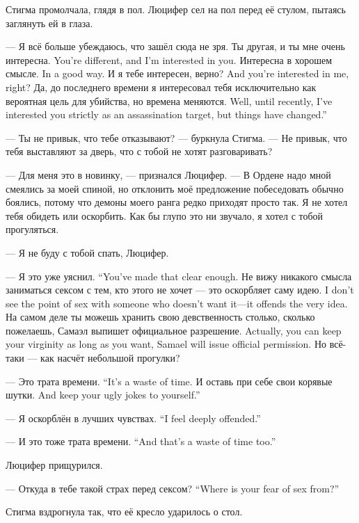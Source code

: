 Стигма промолчала, глядя в пол.
Люцифер сел на пол перед её стулом, пытаясь заглянуть ей в глаза.

--- Я всё больше убеждаюсь, что зашёл сюда не зря.
{Ты другая, и ты мне очень интересна.}
{You're different, and I'm interested in you.}
{Интересна в хорошем смысле.}
{In a good way.}
{И я тебе интересен, верно?}
{And you're interested in me, right?}
{Да, до последнего времени я интересовал тебя исключительно как вероятная цель для убийства, но времена меняются.}
{Well, until recently, I've interested you strictly as an assassination target, but things have changed.''}

--- Ты не привык, что тебе отказывают? --- буркнула Стигма.
--- Не привык, что тебя выставляют за дверь, что с тобой не хотят разговаривать?

--- Для меня это в новинку, --- признался Люцифер.
--- В Ордене надо мной смеялись за моей спиной, но отклонить моё предложение побеседовать обычно боялись, потому что демоны моего ранга редко приходят просто так.
Я не хотел тебя обидеть или оскорбить.
Как бы глупо это ни звучало, я хотел с тобой прогуляться.

--- Я не буду с тобой спать, Люцифер.

{--- Я это уже уяснил.}
{``You've made that clear enough.}
{Не вижу никакого смысла заниматься сексом с тем, кто этого не хочет --- это оскорбляет саму идею.}
{I don't see the point of sex with someone who doesn't want it---it offends the very idea.}
{На самом деле ты можешь хранить свою девственность столько, сколько пожелаешь, Самаэл выпишет официальное разрешение.}
{Actually, you can keep your virginity as long as you want, Samael will issue official permission.}
Но всё-таки --- как насчёт небольшой прогулки?

{--- Это трата времени.}
{``It's a waste of time.}
{И оставь при себе свои корявые шутки.}
{And keep your ugly jokes to yourself.''}

{--- Я оскорблён в лучших чувствах.}
{``I feel deeply offended.''}

{--- И это тоже трата времени.}
{``And that's a waste of time too.''}

Люцифер прищурился.

{--- Откуда в тебе такой страх перед сексом?}
{``Where is your fear of sex from?''}

Стигма вздрогнула так, что её кресло ударилось о стол.

